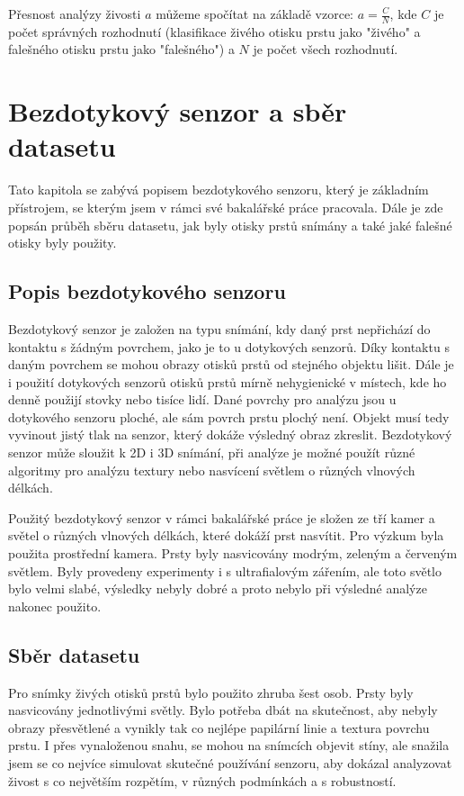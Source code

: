 Přesnost analýzy živosti $a$ můžeme spočítat na základě vzorce:
$a = \frac{C}{N}$, kde $C$ je počet správných rozhodnutí (klasifikace živého otisku prstu jako "živého" a falešného otisku prstu jako "falešného") a $N$ je počet všech rozhodnutí. \cite{GottschlichStudy}

\chapter{Bezdotykový senzor a sběr datasetu}
Tato kapitola se zabývá popisem bezdotykového senzoru, který je základním přístrojem, se kterým jsem v rámci své bakalářské práce pracovala. Dále je zde popsán průběh sběru datasetu, jak byly otisky prstů snímány a také jaké falešné otisky byly použity.

\section{Popis bezdotykového senzoru}
Bezdotykový senzor je založen na typu snímání, kdy daný prst nepřichází do kontaktu s žádným povrchem, jako je to u dotykových senzorů. Díky kontaktu s daným povrchem se mohou obrazy otisků prstů od stejného objektu lišit. Dále je i použití dotykových senzorů otisků prstů mírně nehygienické v místech, kde ho denně použijí stovky nebo tisíce lidí. Dané povrchy pro analýzu jsou u dotykového senzoru ploché, ale sám povrch prstu plochý není. Objekt musí tedy vyvinout jistý tlak na senzor, který dokáže výsledný obraz zkreslit. Bezdotykový senzor může sloužit k 2D i 3D snímání, při analýze je možné použít různé algoritmy pro analýzu textury nebo nasvícení světlem o různých vlnových délkách. \cite{TouchlessSensorStudy}

Použitý bezdotykový senzor v rámci bakalářské práce je složen ze tří kamer a světel o různých vlnových délkách, které dokáží prst nasvítit. Pro výzkum byla použita prostřední kamera. Prsty byly nasvicovány modrým, zeleným a červeným světlem. Byly provedeny experimenty i s ultrafialovým zářením, ale toto světlo bylo velmi slabé, výsledky nebyly dobré a proto nebylo při výsledné analýze nakonec použito.

\section{Sběr datasetu}
Pro snímky živých otisků prstů bylo použito zhruba šest osob. Prsty byly nasvicovány jednotlivými světly. Bylo potřeba dbát na skutečnost, aby nebyly obrazy přesvětlené a vynikly tak co nejlépe papilární linie a textura povrchu prstu. I přes vynaloženou snahu, se mohou na snímcích objevit stíny, ale snažila jsem se co nejvíce simulovat skutečné používání senzoru, aby dokázal analyzovat živost s co největším rozpětím, v různých podmínkách a s robustností. 

